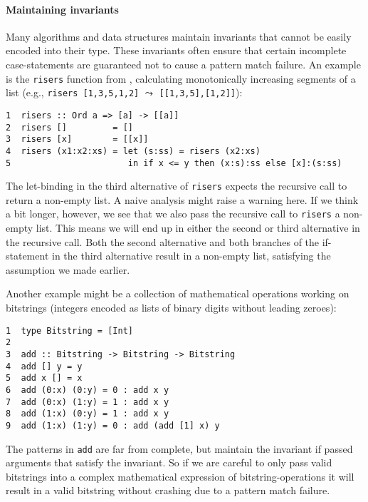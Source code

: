 \documentclass[a4paper]{report}
\begin{document}
\paragraph{Maintaining invariants}
Many algorithms and data structures maintain invariants that cannot be easily encoded into their type. These invariants often ensure that certain incomplete case-statements are guaranteed not to cause a pattern match failure. An example is the {\tt risers} function from \cite{DBLP:conf/sfp/MitchellR05}, calculating monotonically increasing segments of a list (e.g., {\tt risers [1,3,5,1,2]} $\leadsto$ {\tt [[1,3,5],[1,2]]}):

\begin{verbatim}
1  risers :: Ord a => [a] -> [[a]]
2  risers []         = []
3  risers [x]        = [[x]]
4  risers (x1:x2:xs) = let (s:ss) = risers (x2:xs)
5                       in if x <= y then (x:s):ss else [x]:(s:ss)
\end{verbatim}

The let-binding in the third alternative of {\tt risers} expects the recursive call to return a non-empty list. A naive analysis might raise a warning here. If we think a bit longer, however, we see that we also pass the recursive call to {\tt risers} a non-empty list. This means we will end up in either the second or third alternative in the recursive call. Both the second alternative and both branches of the if-statement in the third alternative result in a non-empty list, satisfying the assumption we made earlier.

Another example might be a collection of mathematical operations working on bitstrings (integers encoded as lists of binary digits without leading zeroes):
\begin{verbatim}
1  type Bitstring = [Int]
2
3  add :: Bitstring -> Bitstring -> Bitstring
4  add [] y = y
5  add x [] = x
6  add (0:x) (0:y) = 0 : add x y
7  add (0:x) (1:y) = 1 : add x y
8  add (1:x) (0:y) = 1 : add x y
9  add (1:x) (1:y) = 0 : add (add [1] x) y
\end{verbatim}

The patterns in {\tt add} are far from complete, but maintain the invariant if passed arguments that satisfy the invariant. So if we are careful to only pass valid bitstrings into a complex mathematical expression of bitstring-operations it will result in a valid bitstring without crashing due to a pattern match failure.

\end{document}
